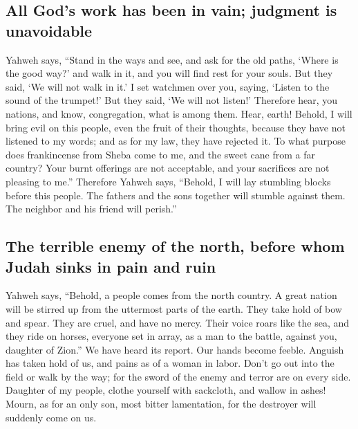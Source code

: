 \hypertarget{all-gods-work-has-been-in-vain-judgment-is-unavoidable}{%
\subsection{All God's work has been in vain; judgment is
unavoidable}\label{all-gods-work-has-been-in-vain-judgment-is-unavoidable}}

 Yahweh says, ``Stand in the ways and see, and ask for
the old paths, `Where is the good way?' and walk in it, and you will
find rest for your souls. But they said, `We will not walk in it.'
 I set watchmen over you, saying, `Listen to the sound of
the trumpet!' But they said, `We will not listen!' 
Therefore hear, you nations, and know, congregation, what is among them.
 Hear, earth! Behold, I will bring evil on this people,
even the fruit of their thoughts, because they have not listened to my
words; and as for my law, they have rejected it.  To what
purpose does frankincense from Sheba come to me, and the sweet cane from
a far country? Your burnt offerings are not acceptable, and your
sacrifices are not pleasing to me.''  Therefore Yahweh
says, ``Behold, I will lay stumbling blocks before this people. The
fathers and the sons together will stumble against them. The neighbor
and his friend will perish.''

\hypertarget{the-terrible-enemy-of-the-north-before-whom-judah-sinks-in-pain-and-ruin}{%
\subsection{The terrible enemy of the north, before whom Judah sinks in
pain and
ruin}\label{the-terrible-enemy-of-the-north-before-whom-judah-sinks-in-pain-and-ruin}}

 Yahweh says, ``Behold, a people comes from the north
country. A great nation will be stirred up from the uttermost parts of
the earth.  They take hold of bow and spear. They are
cruel, and have no mercy. Their voice roars like the sea, and they ride
on horses, everyone set in array, as a man to the battle, against you,
daughter of Zion.''  We have heard its report. Our hands
become feeble. Anguish has taken hold of us, and pains as of a woman in
labor.  Don't go out into the field or walk by the way;
for the sword of the enemy and terror are on every side. 
Daughter of my people, clothe yourself with sackcloth, and wallow in
ashes! Mourn, as for an only son, most bitter lamentation, for the
destroyer will suddenly come on us.

